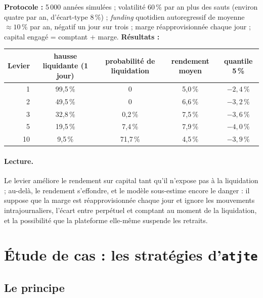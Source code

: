 \begin{codebox}
\textbf{Protocole :} 5\,000 années simulées ; volatilité 60\,\% par an plus des sauts (environ quatre par an, d'écart-type 8\,\%) ; \emph{funding} quotidien autoregressif de moyenne $\approx10\,\%$ par an, négatif un jour sur trois ; marge réapprovisionnée chaque jour ; capital engagé = comptant + marge. \textbf{Résultats :}
\begin{center}\small
\begin{tabular}{rcccc}
\toprule
Levier & hausse liquidante (1 jour) & probabilité de liquidation & rendement moyen & quantile 5\,\% \\
\midrule
1 & 99,5\,\% & 0 & 5,0\,\% & $-2{,}4\,\%$\\
2 & 49,5\,\% & 0 & 6,6\,\% & $-3{,}2\,\%$\\
3 & 32,8\,\% & 0,2\,\% & 7,5\,\% & $-3{,}6\,\%$\\
5 & 19,5\,\% & 7,4\,\% & 7,9\,\% & $-4{,}0\,\%$\\
10 & 9,5\,\% & 71,7\,\% & 4,5\,\% & $-3{,}9\,\%$\\
\bottomrule
\end{tabular}
\end{center}
\end{codebox}

\paragraph{Lecture.} Le levier améliore le rendement sur capital tant qu'il n'expose pas à la liquidation ; au-delà, le rendement s'effondre, et le modèle sous-estime encore le danger : il suppose que la marge est réapprovisionnée chaque jour et ignore les mouvements intrajournaliers, l'écart entre perpétuel et comptant au moment de la liquidation, et la possibilité que la plateforme elle-même suspende les retraits.

\section{Étude de cas : les stratégies d'\texttt{atjte}}

\subsection{Le principe}

